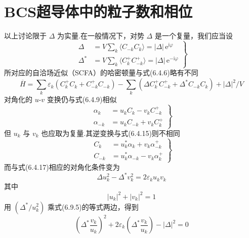 \section{BCS超导体中的粒子数和相位}

以上讨论限于 $\Delta$ 为实量.在一般情况下，对势 $\Delta$ 是一个复量，我们应当设
\begin{equation}
  \left.
  \begin{aligned}
    \Delta&=V\sum_{k}\langle C_{-k}C_{k}\rangle=|\Delta|\,\mathrm{e}^{\mathrm{i}\varphi}\\
    \Delta^{*}&=V\sum_{k}\langle C^{+}_{k}C^{+}_{-k}\rangle
    =|\Delta|\,\mathrm{e}^{-\mathrm{i}\varphi}
  \end{aligned}\right\}
\end{equation}
所对应的自洽场近似（SCFA）的哈密顿量与式(6.4.6)略有不同
\begin{equation}
  \overline{H}=\sum_{k}\varepsilon_{k}
  \left(C^{+}_{k}C_{k}+C^{+}_{-k}C_{-k}\right)
  -\sum_{k}\left(\Delta C^{+}_{k}C^{+}_{-k}
  +\Delta^{*}C_{-k}C_{k}\right)+|\Delta|^{2}/V
\end{equation}
对角化的 $u$-$v$ 变换仍与式(6.4.9)相似
\begin{equation}
  \left.
  \begin{aligned}
    \alpha_{k}&=u_{k}C_{k}-v_{k}C^{+}_{-k}\\
    \alpha_{-k}&=u_{k}C_{-k}+v_{k}C^{+}_{k}
  \end{aligned}\right\}
\end{equation}
但 $u_{k}$ 与 $v_{k}$ 也应取为复量.其逆变换与式(6.4.15)则不相同
\begin{equation}
  \left.
  \begin{aligned}
    C_{k}&=u^{*}_{k}\alpha_{k}+v_{k}\alpha^{+}_{-k}\\
    C_{-k}&=u^{*}_{k}\alpha_{-k}-v_{k}\alpha^{+}_{k}
  \end{aligned}\right\}
\end{equation}
而与式(6.4.17)相应的对角化条件变为
\begin{equation}
  \Delta u_{k}^{2}-\Delta^{*}v_{k}^{2}=2\varepsilon_{k}u_{k}v_{k}
\end{equation}
其中
\begin{equation}
  |u_{k}|^{2}+|v_{k}|^{2}=1
\end{equation}
用 $\left(\Delta^{*}/u_{k}^{2}\right)$ 乘式(6.9.5)的等式两边，得到
\begin{equation}
  \left(\Delta^{*}\frac{v_{k}}{u_{k}}\right)^{2}
  +2\varepsilon_{k}\left(\Delta^{*}\frac{v_{k}}{u_{k}}\right)
  -|\Delta|^{2}=0
\end{equation}
